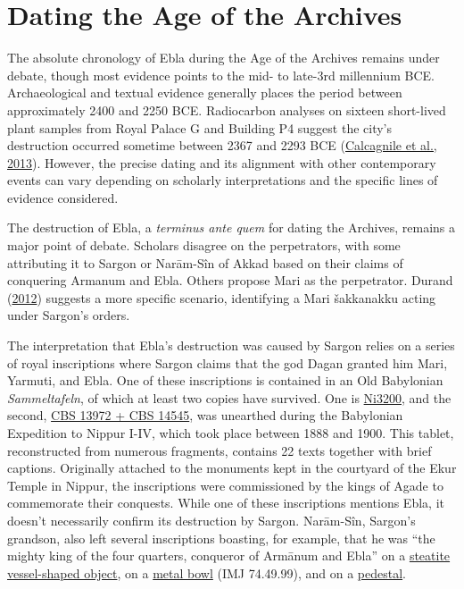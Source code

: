 \documentclass[
]{book}
\begin{document}
\hypertarget{dating-the-age-of-the-archives}{%
\section{Dating the Age of the Archives}\label{dating-the-age-of-the-archives}}

The absolute chronology of Ebla during the Age of the Archives remains under debate, though most evidence points to the mid- to late-3rd millennium BCE. Archaeological and textual evidence generally places the period between approximately 2400 and 2250 BCE. Radiocarbon analyses on sixteen short-lived plant samples from Royal Palace G and Building P4 suggest the city's destruction occurred sometime between 2367 and 2293 BCE (\protect\hyperlink{ref-CalcagnileEtAl2013}{Calcagnile et al., 2013}). However, the precise dating and its alignment with other contemporary events can vary depending on scholarly interpretations and the specific lines of evidence considered.

The destruction of Ebla, a \emph{terminus ante quem} for dating the Archives, remains a major point of debate. Scholars disagree on the perpetrators, with some attributing it to Sargon or Narām-Sîn of Akkad based on their claims of conquering Armanum and Ebla. Others propose Mari as the perpetrator. Durand (\protect\hyperlink{ref-Durand2012}{2012}) suggests a more specific scenario, identifying a Mari šakkanakku acting under Sargon's orders.

The interpretation that Ebla's destruction was caused by Sargon relies on a series of royal inscriptions where Sargon claims that the god Dagan granted him Mari, Yarmuti, and Ebla. One of these inscriptions is contained in an Old Babylonian \emph{Sammeltafeln}, of which at least two copies have survived. One is \href{https://cdli.mpiwg-berlin.mpg.de/artifacts/227510}{Ni3200}, and the second, \href{https://www.penn.museum/collections/object/347461}{CBS 13972 + CBS 14545}, was unearthed during the Babylonian Expedition to Nippur I-IV, which took place between 1888 and 1900. This tablet, reconstructed from numerous fragments, contains 22 texts together with brief captions. Originally attached to the monuments kept in the courtyard of the Ekur Temple in Nippur, the inscriptions were commissioned by the kings of Agade to commemorate their conquests. While one of these inscriptions mentions Ebla, it doesn't necessarily confirm its destruction by Sargon. Narām-Sîn, Sargon's grandson, also left several inscriptions boasting, for example, that he was ``the mighty king of the four quarters, conqueror of Armānum and Ebla'' on a \href{https://www.carmentis.be/eMP/eMuseumPlus?service=ExternalInterface\&module=collection\&objectId=87396\&viewType=detailView}{steatite vessel-shaped object}, on a \href{https://cdli.mpiwg-berlin.mpg.de/artifacts/216630}{metal bowl} (IMJ 74.49.99), and on a \href{https://collections.louvre.fr/en/ark:/53355/cl010121772}{pedestal}.
\end{document}
